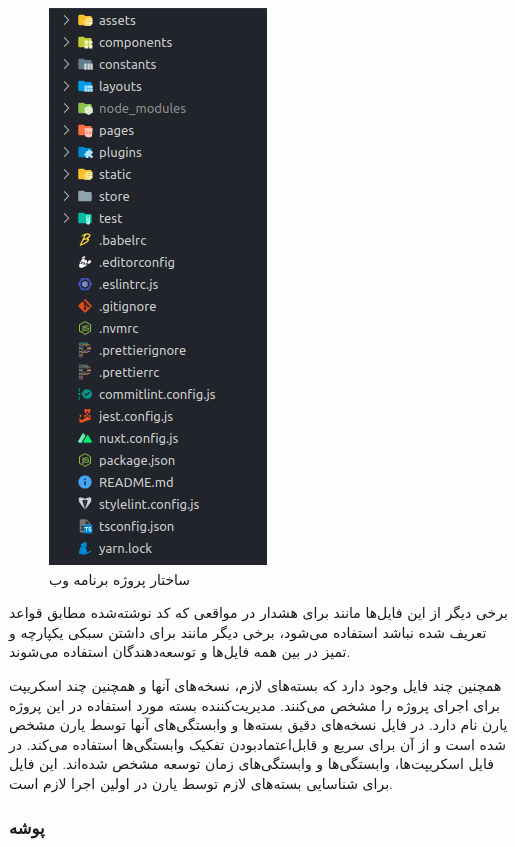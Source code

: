 \begin{figure}[!h]
\centering\includegraphics[scale=.75]{front_structure.png}
\caption{ساختار پروژه برنامه وب}\label{fig:front_structure}
\end{figure}

برخی دیگر از این فایل‌ها مانند  برای هشدار در مواقعی که کد نوشته‌شده مطابق قواعد تعریف شده نباشد استفاده می‌شود، برخی دیگر مانند  برای داشتن سبکی یکپارچه و تمیز در بین همه فایل‌ها و توسعه‌دهندگان استفاده می‌شوند.

همچنین چند فایل وجود دارد که بسته‌های لازم، نسخه‌های آنها و همچنین چند اسکریپت برای اجرای پروژه را مشخص می‌کنند. مدیریت‌کننده بسته مورد استفاده در این پروژه یارن نام دارد. در فایل  نسخه‌های دقیق بسته‌ها و وابستگی‌های آنها توسط یارن مشخص شده است و از آن برای سریع و قابل‌اعتمادبودن تفکیک وابستگی‌ها استفاده می‌کند. در فایل  اسکریپت‌ها، وابستگی‌ها و وابستگی‌های زمان توسعه مشخص شده‌اند. این فایل برای شناسایی بسته‌های لازم توسط یارن در اولین اجرا لازم است.

\subsubsection{پوشه }


